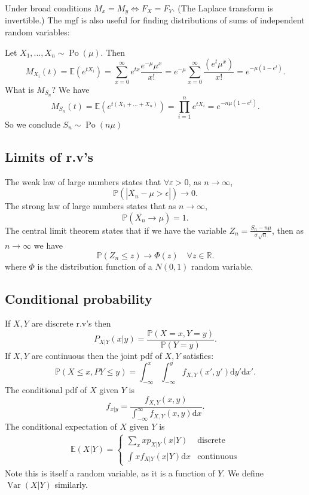 \documentclass[a4paper]{scrartcl}
\begin{document}
Under broad conditions $M_{x}=M_{y} \iff F_{X}=F_{Y}$. (The Laplace transform is invertible.) The mgf is also useful for finding distributions of sums of independent random variables: 
\begin{example}
     Let $X_1 , \ldots ,X_n \sim \operatorname{Po}(\mu)$. Then \[
     M_{X_{i}}(t)=\mathbb{E}(e^{tX_{i}})=\sum_{x=0}^{ \infty}e^{tx} \frac{e^{-\mu}\mu^{x}}{x!}=e^{-\mu}\sum_{x=0}^{ \infty}\frac{(e^{t}\mu^{x})}{x!}=e^{-\mu (1-e^{t})}
     .\] 
     What is $M_{S_{n}}$? We have \[
     M_{S_{n}}(t)=\mathbb{E}(e^{t (X_1 +\ldots +X_n)})=\prod_{i=1}^n e^{tX_{i}}=e^{-n \mu (1-e^{t})}
     .\] So we conclude $S_{n} \sim \operatorname{Po}(n \mu)$ 
\end{example}
\subsection{Limits of r.v's}
The weak law of large numbers states that $\forall \varepsilon >0$, as $n \rightarrow \infty$, \[
\mathbb{P} \left(|\overline{X_n} -\mu > \epsilon|\right) \rightarrow 0
.\] 
The strong law of large numbers states that as $n \rightarrow \infty$, \[
\mathbb{P}(\overline{X_{n}} \rightarrow \mu)=1
.\] The central limit theorem states that if we have the variable $Z_{n}= \frac{S_{n}-n \mu}{\sigma \sqrt{n}}$, then as $n \rightarrow \infty$ we have \[
\mathbb{P}(Z_{n} \leq z) \rightarrow \Phi (z) \quad \forall z \in \mathbb{R}
.\] where $\Phi$ is the distribution function of a $N (0,1)$ random variable.  
\subsection{Conditional probability}
If $X,Y$ are discrete r.v's then \[
P_{X|Y}(x|y)= \frac{\mathbb{P}(X=x, Y=y)}{\mathbb{P}(Y=y)}
.\]   
If $X,Y$ are continuous then the joint pdf of $X,Y$ satisfies: \[
\mathbb{P}(X \leq x, P Y \leq y)=\int_{- \infty}^{x}\int_{- \infty}^{y}f_{X,Y} (x',y')\mathrm{d}y'  \mathrm{d}x' 
.\] 
The conditional pdf of $X$ given $Y$ is \[
f_{x|y}= \frac{f_{X,Y}(x,y)}{\int_{- \infty}^{ \infty}f_{X,Y}(x,y) \mathrm{d}x }
.\] 
The conditional expectation of $X$ given $Y$ is 
\begin{align*}
    \mathbb{E}(X|Y)=
    \begin{cases}
        \sum_{x}^{}xp_{X|Y}(x|Y) & \text{discrete}\\
        \int_{}^{}x f_{X|Y}(x|Y) \mathrm{d}x & \text{continuous}
    \end{cases}
\end{align*}
Note this is itself a random variable, as it is a function of $Y$. We define $\operatorname{Var}(X|Y)$ similarly. 
\end{document}
